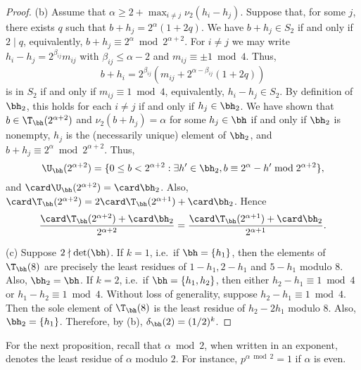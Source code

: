 \documentclass[12pt, reqno, twoside, letterpaper]{amsart}
\begin{document}
\begin{proof}
(b)
%
Assume that $\alpha \ge 2 + \max_{i \ne j} \nu_2(h_i - h_j)$.
%
Suppose that, for some $j$, there exists $q$ such that 
$b + h_j = 2^{\alpha}(1 + 2q)$.
%
We have $b + h_j \in S_2$ if and only if 
$2 \mid q$, equivalently, 
$b + h_j \equiv 2^{\alpha} \bmod 2^{\alpha + 2}$.
%
For $i \ne j$ 
%
we may write $h_i - h_j = 2^{\beta_{ij}}m_{ij}$ with 
$\beta_{ij} \le \alpha - 2$ and $m_{ij} \equiv \pm 1 \bmod 4$.
%
Thus,  
\[
 b + h_i 
  = 2^{\beta_{ij}}(m_{ij} + 2^{\alpha - \beta_{ij}}(1 + 2q))
\]
is in $S_2$ if and only if $m_{ij} \equiv 1 \bmod 4$, 
equivalently, $h_i - h_j \in S_2$.
%
By definition of $\bh_2$, this holds for each $i \ne j$ if and 
only if $h_j \in \bh_2$.
%
We have shown that $b \in \T_{\bh}(2^{\alpha + 2})$ and 
$\nu_2(b + h_j) = \alpha$ for some $h_j \in \bh$ if and only if  
$\bh_2$ is nonempty, $h_j$ is the (necessarily unique) element of 
$\bh_2$, and $b + h_j \equiv 2^{\alpha} \bmod 2^{\alpha + 2}$. 
%
Thus,
\[
  \U_{\bh}(2^{\alpha + 2})
   =
    \{0 \le b < 2^{\alpha + 2} : \exists h' \in \bh_2, b \equiv 2^{\alpha} - h' \bmod 2^{\alpha + 2}\},
\]
and $\card \U_{\bh}(2^{\alpha + 2}) = \card \bh_2$.
%
Also, 
$
 \card \T_{\bh}(2^{\alpha + 2}) 
 = 2\card \T_{\bh}(2^{\alpha + 1}) + \card \bh_2
$.
%
Hence 
\[
 \frac{\card \T_{\bh}(2^{\alpha + 2}) + \card \bh_2}{2^{\alpha + 2}}
  =
   \frac{\card \T_{\bh}(2^{\alpha + 1}) + \card \bh_2}{2^{\alpha + 1}}.
\]

(c) 
%
Suppose $2 \nmid \det(\bh)$.
%
If $k = 1$, i.e.\ if $\bh = \{h_1\}$, then the elements of 
$\T_{\bh}(8)$ are precisely the least residues of 
$1 - h_1, 2 - h_1$ and $5 - h_1$ modulo $8$.
%
Also, $\bh_2 = \bh$.
%
If $k = 2$, i.e.\ if $\bh = \{h_1,h_2\}$, then either 
$h_2 - h_1 \equiv 1 \bmod 4$ or $h_1 - h_2 \equiv 1 \bmod 4$.
%
Without loss of generality, suppose $h_2 - h_1 \equiv 1 \bmod 4$.
%
Then the sole element of $\T_{\bh}(8)$ is the least residue of 
$h_2 - 2h_1$ modulo $8$.
%
Also, $\bh_2 = \{h_1\}$.
%
Therefore, by (b), $\delta_{\bh}(2) = (1/2)^k$.
\end{proof}

For the next proposition, recall that $\alpha \bmod 2$, when 
written in an exponent, denotes the least residue of $\alpha$ 
modulo $2$.
%
For instance, $p^{\alpha \bmod 2} = 1$ if $\alpha$ is even.
\end{document}
